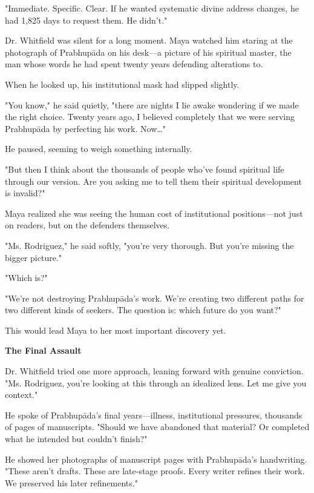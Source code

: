 \documentclass[12pt,twoside]{book}
\begin{document}
"Immediate. Specific. Clear. If he wanted systematic divine address changes, he had 1,825 days to request them. He didn't."

Dr. Whitfield was silent for a long moment. Maya watched him staring at the photograph of Prabhupāda on his desk—a picture of his spiritual master, the man whose words he had spent twenty years defending alterations to.

When he looked up, his institutional mask had slipped slightly.

"You know," he said quietly, "there are nights I lie awake wondering if we made the right choice. Twenty years ago, I believed completely that we were serving Prabhupāda by perfecting his work. Now\ldots{}"

He paused, seeming to weigh something internally.

"But then I think about the thousands of people who've found spiritual life through our version. Are you asking me to tell them their spiritual development is invalid?"

Maya realized she was seeing the human cost of institutional positions—not just on readers, but on the defenders themselves.

"Ms. Rodriguez," he said softly, "you're very thorough. But you're missing the bigger picture."

"Which is?"

"We're not destroying Prabhupāda's work. We're creating two different paths for two different kinds of seekers. The question is: which future do you want?"

This would lead Maya to her most important discovery yet.


\vspace{0.5cm}
\textbf{The Final Assault}
\vspace{0.2cm}


Dr. Whitfield tried one more approach, leaning forward with genuine conviction. "Ms. Rodriguez, you're looking at this through an idealized lens. Let me give you context."

He spoke of Prabhupāda's final years—illness, institutional pressures, thousands of pages of manuscripts. "Should we have abandoned that material? Or completed what he intended but couldn't finish?"

He showed her photographs of manuscript pages with Prabhupāda's handwriting. "These aren't drafts. These are late-stage proofs. Every writer refines their work. We preserved his later refinements."
\end{document}
